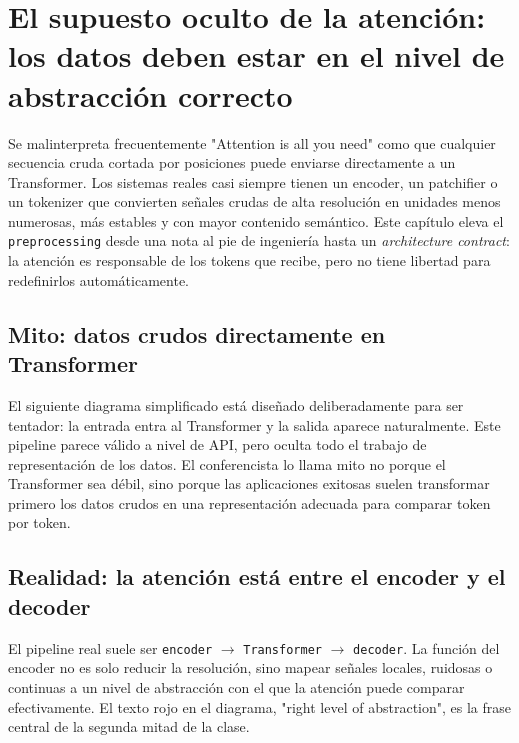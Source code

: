 \section{El supuesto oculto de la atención: los datos deben estar en el nivel de abstracción correcto}

Se malinterpreta frecuentemente "Attention is all you need" como que cualquier secuencia cruda cortada por posiciones puede enviarse directamente a un Transformer. Los sistemas reales casi siempre tienen un encoder, un patchifier o un tokenizer que convierten señales crudas de alta resolución en unidades menos numerosas, más estables y con mayor contenido semántico. Este capítulo eleva el \texttt{preprocessing} desde una nota al pie de ingeniería hasta un \textit{architecture contract}: la atención es responsable de los tokens que recibe, pero no tiene libertad para redefinirlos automáticamente.

\subsection{Mito: datos crudos directamente en Transformer}

El siguiente diagrama simplificado está diseñado deliberadamente para ser tentador: la entrada entra al Transformer y la salida aparece naturalmente. Este pipeline parece válido a nivel de API, pero oculta todo el trabajo de representación de los datos. El conferencista lo llama mito no porque el Transformer sea débil, sino porque las aplicaciones exitosas suelen transformar primero los datos crudos en una representación adecuada para comparar token por token.


\subsection{Realidad: la atención está entre el encoder y el decoder}

El pipeline real suele ser \texttt{encoder} $\rightarrow$ \texttt{Transformer} $\rightarrow$ \texttt{decoder}. La función del encoder no es solo reducir la resolución, sino mapear señales locales, ruidosas o continuas a un nivel de abstracción con el que la atención puede comparar efectivamente. El texto rojo en el diagrama, "right level of abstraction", es la frase central de la segunda mitad de la clase.

